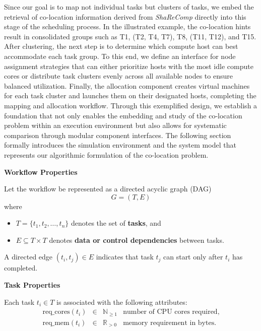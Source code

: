 Since our goal is to map not individual tasks but clusters of tasks, we embed the retrieval of co-location information derived from \textit{ShaReComp} directly into this stage of the scheduling process. In the illustrated example, the co-location hints result in consolidated groups such as T1, (T2, T4, T7), T8, (T11, T12), and T15. After clustering, the next step is to determine which compute host can best accommodate each task group. To this end, we define an interface for node assignment strategies that can either prioritize hosts with the most idle compute cores or distribute task clusters evenly across all available nodes to ensure balanced utilization. Finally, the allocation component creates virtual machines for each task cluster and launches them on their designated hosts, completing the mapping and allocation workflow. Through this exemplified design, we establish a foundation that not only enables the embedding and study of the co-location problem within an execution environment but also allows for systematic comparison through modular component interfaces. The following section formally introduces the simulation environment and the system model that represents our algorithmic formulation of the co-location problem.

\newpage

\textbf{Workflow Properties}

Let the workflow be represented as a directed acyclic graph (DAG)
\[
    G = (T, E)
\]
where
\begin{itemize}
    \item $T = \{t_1, t_2, \dots, t_n\}$ denotes the set of \textbf{tasks}, and
    \item $E \subseteq T \times T$ denotes \textbf{data or control dependencies} between tasks.
\end{itemize}
A directed edge $(t_i, t_j) \in E$ indicates that task $t_j$ can start only after $t_i$ has completed.

\textbf{Task Properties}

Each task \( t_i \in T \) is associated with the following attributes:
\[
    \begin{array}{rcll}
        \text{req\_cores}(t_i) & \in & \mathbb{N}_{\ge 1} & \text{number of CPU cores required}, \\[4pt]
        \text{req\_mem}(t_i)   & \in & \mathbb{R}_{>0}    & \text{memory requirement in bytes.}
    \end{array}
\]

